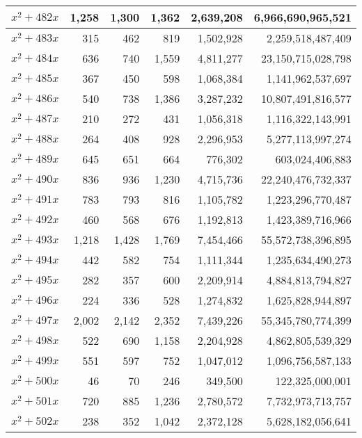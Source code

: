 \documentclass[a4paper]{amsproc}
\theoremstyle{plain}
\theoremstyle{named}
\begin{document}
\begin{longtable}{ | l | r | r | r | r | r | }
$x^2 + 482x$ & 1{,}258 & 1{,}300 & 1{,}362 & 2{,}639{,}208 & 6{,}966{,}690{,}965{,}521 \\ \hline
$x^2 + 483x$ & 315 & 462 & 819 & 1{,}502{,}928 & 2{,}259{,}518{,}487{,}409 \\ \hline
$x^2 + 484x$ & 636 & 740 & 1{,}559 & 4{,}811{,}277 & 23{,}150{,}715{,}028{,}798 \\ \hline
$x^2 + 485x$ & 367 & 450 & 598 & 1{,}068{,}384 & 1{,}141{,}962{,}537{,}697 \\ \hline
$x^2 + 486x$ & 540 & 738 & 1{,}386 & 3{,}287{,}232 & 10{,}807{,}491{,}816{,}577 \\ \hline
$x^2 + 487x$ & 210 & 272 & 431 & 1{,}056{,}318 & 1{,}116{,}322{,}143{,}991 \\ \hline
$x^2 + 488x$ & 264 & 408 & 928 & 2{,}296{,}953 & 5{,}277{,}113{,}997{,}274 \\ \hline
$x^2 + 489x$ & 645 & 651 & 664 & 776{,}302 & 603{,}024{,}406{,}883 \\ \hline
$x^2 + 490x$ & 836 & 936 & 1{,}230 & 4{,}715{,}736 & 22{,}240{,}476{,}732{,}337 \\ \hline
$x^2 + 491x$ & 783 & 793 & 816 & 1{,}105{,}782 & 1{,}223{,}296{,}770{,}487 \\ \hline
$x^2 + 492x$ & 460 & 568 & 676 & 1{,}192{,}813 & 1{,}423{,}389{,}716{,}966 \\ \hline
$x^2 + 493x$ & 1{,}218 & 1{,}428 & 1{,}769 & 7{,}454{,}466 & 55{,}572{,}738{,}396{,}895 \\ \hline
$x^2 + 494x$ & 442 & 582 & 754 & 1{,}111{,}344 & 1{,}235{,}634{,}490{,}273 \\ \hline
$x^2 + 495x$ & 282 & 357 & 600 & 2{,}209{,}914 & 4{,}884{,}813{,}794{,}827 \\ \hline
$x^2 + 496x$ & 224 & 336 & 528 & 1{,}274{,}832 & 1{,}625{,}828{,}944{,}897 \\ \hline
$x^2 + 497x$ & 2{,}002 & 2{,}142 & 2{,}352 & 7{,}439{,}226 & 55{,}345{,}780{,}774{,}399 \\ \hline
$x^2 + 498x$ & 522 & 690 & 1{,}158 & 2{,}204{,}928 & 4{,}862{,}805{,}539{,}329 \\ \hline
$x^2 + 499x$ & 551 & 597 & 752 & 1{,}047{,}012 & 1{,}096{,}756{,}587{,}133 \\ \hline
$x^2 + 500x$ & 46 & 70 & 246 & 349{,}500 & 122{,}325{,}000{,}001 \\ \hline
$x^2 + 501x$ & 720 & 885 & 1{,}236 & 2{,}780{,}572 & 7{,}732{,}973{,}713{,}757 \\ \hline
$x^2 + 502x$ & 238 & 352 & 1{,}042 & 2{,}372{,}128 & 5{,}628{,}182{,}056{,}641 \\ \hline

\end{longtable}
\end{document}
